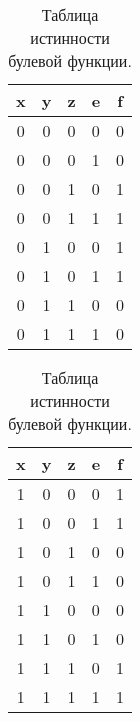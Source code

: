 \documentclass[10pt,a4paper,final]{article} %
\begin{document}
	\begin{table}[h]
		\hspace{4em} %
		\begin{minipage}{.5\textwidth}
			\centering
			\begin{tabular}{c c c c|c}
				x & y & z & e & f \\
				\hline
				0 & 0 & 0 & 0 & 0 \\
				
				0 & 0 & 0 & 1 & 0 \\
				
				0 & 0 & 1 & 0 & 1 \\
				
				0 & 0 & 1 & 1 & 1 \\
				
				0 & 1 & 0 & 0 & 1 \\
				
				0 & 1 & 0 & 1 & 1 \\
				
				0 & 1 & 1 & 0 & 0 \\
				
				0 & 1 & 1 & 1 & 0 \\
			\end{tabular}
		\end{minipage}%
		\hspace{-10em} %
		\begin{minipage}{.5\textwidth}
			\centering
			\begin{tabular}{c c c c|c}
				x & y & z & e & f \\
				\hline
				1 & 0 & 0 & 0 & 1 \\
				
				1 & 0 & 0 & 1 & 1 \\
				
				1 & 0 & 1 & 0 & 0 \\
				
				1 & 0 & 1 & 1 & 0 \\
				
				1 & 1 & 0 & 0 & 0 \\
				
				1 & 1 & 0 & 1 & 0 \\
				
				1 & 1 & 1 & 0 & 1 \\
				
				1 & 1 & 1 & 1 & 1 \\
			\end{tabular}
			
		\end{minipage}
		\caption{Таблица истинности булевой функции.}
	\end{table}
	
\end{document}
